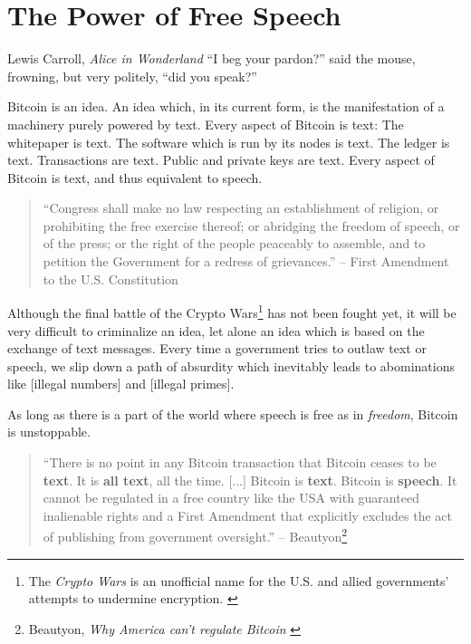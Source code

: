 \chapter{The Power of Free Speech}
\label{les:6}

\begin{chapquote}{Lewis Carroll, \textit{Alice in Wonderland}}
``I beg your pardon?'' said the mouse, frowning, but very politely, ``did you speak?''
\end{chapquote}

Bitcoin is an idea. An idea which, in its current form, is the
manifestation of a machinery purely powered by text. Every aspect of
Bitcoin is text: The whitepaper is text. The software which is run by
its nodes is text. The ledger is text. Transactions are text. Public and
private keys are text. Every aspect of Bitcoin is text, and thus
equivalent to speech.

\begin{quotation}
``Congress shall make no law respecting an establishment of religion,
or prohibiting the free exercise thereof; or abridging the freedom of
speech, or of the press; or the right of the people peaceably to
assemble, and to petition the Government for a redress of grievances.''
\flushright -- First Amendment to the U.S. Constitution
\end{quotation}

Although the final battle of the Crypto Wars\footnote{The \textit{Crypto Wars}
is an unofficial name for the U.S. and allied governments' attempts to undermine
encryption. \cite{eff-cryptowars} \cite{wiki:cryptowars}} has not been fought
yet, it will be very difficult to criminalize an idea, let alone an idea which
is based on the exchange of text messages. Every time a government tries to
outlaw text or speech, we slip down a path of absurdity which inevitably leads
to abominations like [illegal numbers] and [illegal primes].

As long as there is a part of the world where speech is free as in
\textit{freedom}, Bitcoin is unstoppable.

\begin{quotation}
``There is no point in any Bitcoin transaction that Bitcoin ceases to be
\textbf{text}. It is \textbf{all text}, all the time. [...] Bitcoin is
\textbf{text}. Bitcoin is \textbf{speech}. It cannot be regulated in a free
country like the USA with guaranteed inalienable rights and a First Amendment
that explicitly excludes the act of publishing from government oversight.''
\flushright -- Beautyon\footnote{Beautyon, \textit{Why America can't regulate
Bitcoin} \cite{america-regulate-bitcoin}}
\end{quotation}

